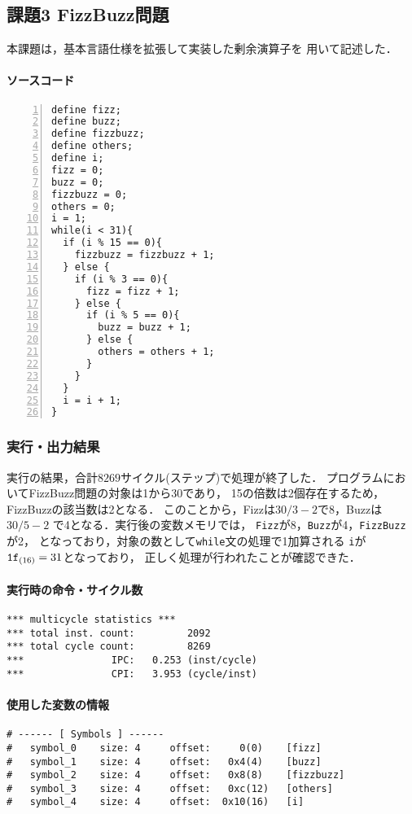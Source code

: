 \subsection{課題3 FizzBuzz問題}
本課題は，基本言語仕様を拡張して実装した剰余演算子を
用いて記述した．

\paragraph*{ソースコード}
\begin{Verbatim}[numbers=left, xleftmargin=10mm, numbersep=6pt, frame=single,
  fontsize=\small, baselinestretch=0.8]
define fizz;
define buzz;
define fizzbuzz;
define others;
define i;
fizz = 0;
buzz = 0;
fizzbuzz = 0;
others = 0;
i = 1;
while(i < 31){
  if (i % 15 == 0){
    fizzbuzz = fizzbuzz + 1;
  } else {
    if (i % 3 == 0){
      fizz = fizz + 1;
    } else {
      if (i % 5 == 0){
        buzz = buzz + 1;
      } else {
        others = others + 1;
      }
    }
  }
  i = i + 1;
}  
\end{Verbatim}

\subsubsection{実行・出力結果}
実行の結果，合計$8269$サイクル(ステップ)で処理が終了した．
プログラムにおいてFizzBuzz問題の対象は1から30であり，
15の倍数は2個存在するため，FizzBuzzの該当数は2となる．
このことから，Fizzは$30 / 3 - 2$で8，Buzzは$30 / 5 - 2$
で4となる．実行後の変数メモリでは，
\verb|Fizz|が8，\verb|Buzz|が4，\verb|FizzBuzz|が2，
となっており，対象の数として\verb|while|文の処理で1加算される
\verb|i|が$\verb|1f|_{(16)} = 31$となっており，
正しく処理が行われたことが確認できた．

\paragraph*{実行時の命令・サイクル数}
\begin{Verbatim}[numbers=none, frame=single,
fontsize=\small, baselinestretch=0.8]
*** multicycle statistics ***
*** total inst. count:         2092
*** total cycle count:         8269
***               IPC:   0.253 (inst/cycle)
***               CPI:   3.953 (cycle/inst)
\end{Verbatim}

\paragraph*{使用した変数の情報}
\begin{Verbatim}[numbers=none, frame=single,
  fontsize=\small, baselinestretch=0.8]
# ------ [ Symbols ] ------
# 	symbol_0 	size: 4 	offset:     0(0) 	[fizz]
# 	symbol_1 	size: 4 	offset:   0x4(4) 	[buzz]
# 	symbol_2 	size: 4 	offset:   0x8(8) 	[fizzbuzz]
# 	symbol_3 	size: 4 	offset:   0xc(12) 	[others]
# 	symbol_4 	size: 4 	offset:  0x10(16) 	[i]  
\end{Verbatim}

